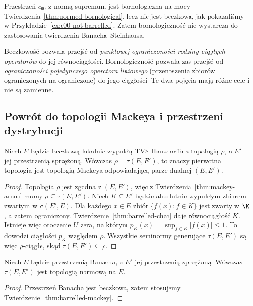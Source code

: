 \begin{przyklad}
Przestrzeń $c_{00}$ z normą supremum jest bornologiczna
na mocy Twierdzenia~\ref{thm:normed-bornological}, lecz
nie jest beczkowa, jak pokazaliśmy w
Przykładzie~\ref{ex:c00-not-barrelled}.
Zatem bornologiczność nie wystarcza do zastosowania
twierdzenia Banacha--Steinhausa.
\end{przyklad}

\begin{uwaga}
Beczkowość pozwala przejść od \emph{punktowej ograniczoności
rodziny ciągłych operatorów} do jej równociągłości.
Bornologiczność pozwala zaś przejść od \emph{ograniczoności
pojedynczego operatora liniowego} (przenoszenia zbiorów
ograniczonych na ograniczone) do jego ciągłości.
Te dwa pojęcia mają różne cele i nie są zamienne.
\end{uwaga}

\subsection{Powrót do topologii Mackeya i przestrzeni dystrybucji}

\begin{twierdzenie}
\label{thm:barrelled-mackey}
Niech $E$ będzie beczkową lokalnie wypukłą TVS Hausdorffa
z topologią $\rho$, a $E'$ jej przestrzenią sprzężoną.
Wówczas $\rho=\tau(E,E')$, to znaczy pierwotna topologia
jest topologią Mackeya odpowiadającą parze dualnej $(E,E')$.
\end{twierdzenie}
\begin{proof}
Topologia $\rho$ jest zgodna z $(E,E')$, więc z Twierdzenia~\ref{thm:mackey-arens} mamy
$\rho\subseteq\tau(E,E')$.
Niech $K\subseteq E'$ będzie absolutnie wypukłym zbiorem
zwartym w $\sigma(E',E)$. Dla każdego $x\in E$
zbiór $\{f(x):f\in K\}$ jest zwarty w $\K$, a zatem
ograniczony. Twierdzenie~\ref{thm:barrelled-char} daje
równociągłość $K$. Istnieje więc otoczenie $U$ zera,
na którym $p_K(x)=\sup_{f\in K}|f(x)|\le1$.
To dowodzi ciągłości $p_K$ względem $\rho$.
Wszystkie seminormy generujące $\tau(E,E')$ są więc
$\rho$-ciągłe, skąd $\tau(E,E')\subseteq\rho$.
\end{proof}

\begin{wniosek}\label{cor:banach-mackey}
Niech $E$ będzie przestrzenią Banacha, a $E'$ jej
przestrzenią sprzężoną. Wówczas
$\tau(E,E')$ jest topologią normową na $E$.
\end{wniosek}
\begin{proof}
Przestrzeń Banacha jest beczkowa, zatem stosujemy
Twierdzenie~\ref{thm:barrelled-mackey}.
\end{proof}

